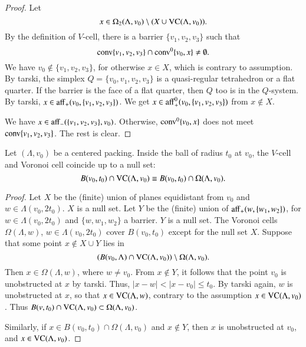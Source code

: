 \begin{proof}  Let 
 $$x \in \Omega_2(\Lambda,v_0)
 \setminus (X\cup{\operatorname{VC}}(\Lambda,v_0)).
 $$
By
the definition of $V$-cell, there is a barrier $\{v_1,v_2,v_3\}$
such that
  $${\operatorname{conv}}\{v_1,v_2,v_3\}\cap {\operatorname{conv}}^0\{v_0,x\}\ne\emptyset.$$ 
We have $v_0\not\in\{v_1,v_2,v_3\}$, for otherwise $x\in X$, 
which is contrary to assumption. 
By tarski,
the simplex $Q=\{v_0,v_1,v_2,v_3\}$ is a quasi-regular tetrahedron
or a flat quarter.  If the barrier is the face of a flat quarter,
then $Q$ too is in
the $Q$-system.  By tarski,  $x\in{\operatorname{aff}}_+(v_0,\{v_1,v_2,v_3\})$.  
We get $x\in{\operatorname{aff}}_+^0(v_0,\{v_1,v_2,v_3\})$ from $x\not\in X$.

We have $x\in{\operatorname{aff}}_-
   (\{v_1,v_2,v_3\},v_0)$. Otherwise, ${\operatorname{conv}}^0\{v_0,x\}$ does
not meet ${\operatorname{conv}}\{v_1,v_2,v_3\}$.
The rest is clear.
\end{proof}



\begin{lemma}
Let $(\Lambda,v_0)$ be a centered packing.
Inside the ball of radius $t_0$ at $v_0$, the $V$-cell and
Voronoi cell coincide up to a null set:
   $$B(v_0,t_0)\cap {\operatorname{VC}}(\Lambda,v_0) \equiv B(v_0,t_0)\cap \Omega(\Lambda,v_0).$$
\end{lemma}

\begin{proof} Let $X$ be the (finite) union of planes equidistant from $v_0$ and $w\in \Lambda(v_0,2t_0)$.  $X$ is a null set.  Let $Y$ be the (finite) union of ${\operatorname{aff}}_+(w,\{w_1,w_2\})$, for $w\in \Lambda(v_0,2t_0)$ and $\{w,w_1,w_2\}$ a barrier.  $Y$ is a null set.
The Voronoi cells $\Omega(\Lambda,w)$, $w\in\Lambda(v_0,2t_0)$ cover
$B(v_0,t_0)$ except for the null set $X$.  
Suppose that some point  $x\not\in X\cup Y$
lies in $$(B(v_0,\Lambda)\cap{\operatorname{VC}}(\Lambda,v_0) )\setminus \Omega(\Lambda,v_0).$$
Then $x\in \Omega(\Lambda,w)$, where
$w\ne v_0$.  
From $x\not\in Y$, it follows that the point $v_0$ is
unobstructed  at $x$ by tarski.  
Thus, $|x-w|< |x-v_0|\le t_0$.  By
tarski again, $w$ is unobstructed at $x$, so
that $x\in {\operatorname{VC}}(\Lambda,w)$, contrary to the assumption
$x\in{\operatorname{VC}}(\Lambda,v_0)$.  Thus $B(v,t_0)\cap{\operatorname{VC}}(\Lambda,v_0)\subset\Omega(\Lambda,v_0)$.

Similarly, if $x\in B(v_0,t_0)\cap \Omega(\Lambda,v_0)$ and $x\not\in Y$,
then $x$ is
unobstructed at $v_0$, and $x\in {\operatorname{VC}}(\Lambda,v_0)$.
\end{proof}

